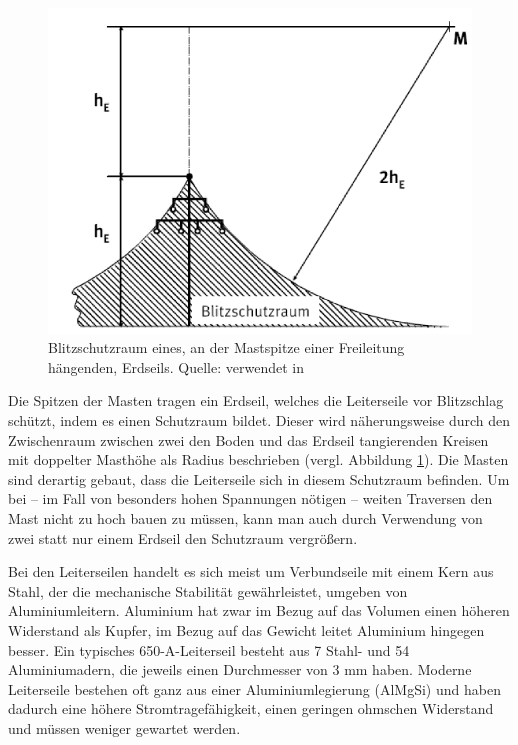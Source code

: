\begin{figure}[tbhn]
\begin{center}
\noindent
\includegraphics[scale=0.8]{blitzschutzraum.png}
\end{center}
\caption{Blitzschutzraum eines, an der Mastspitze einer Freileitung hängenden, Erdseils. Quelle: \cite{Harnischmacher} verwendet in \cite{BfN}}
\label{pic:blitzschutzraum}
\end{figure}

Die Spitzen der Masten tragen ein Erdseil, welches die Leiterseile vor Blitzschlag schützt, indem es einen Schutzraum bildet. Dieser wird näherungsweise durch den Zwischenraum zwischen zwei den Boden und das Erdseil tangierenden Kreisen mit doppelter Masthöhe als Radius beschrieben (vergl. Abbildung \ref{pic:blitzschutzraum}). Die Masten sind derartig gebaut, dass die Leiterseile sich in diesem Schutzraum befinden. Um bei – im Fall von besonders hohen Spannungen nötigen – weiten Traversen den Mast nicht zu hoch bauen zu müssen, kann man auch durch Verwendung von zwei statt nur einem Erdseil den Schutzraum vergrößern.

Bei den Leiterseilen handelt es sich meist um Verbundseile mit einem Kern aus Stahl, der die mechanische Stabilität gewährleistet, umgeben von Aluminiumleitern. Aluminium hat zwar im Bezug auf das Volumen einen höheren Widerstand als Kupfer, im Bezug auf das Gewicht leitet Aluminium hingegen besser. Ein typisches 650-A-Leiterseil besteht aus 7 Stahl- und 54 Aluminiumadern, die jeweils einen Durchmesser von 3 mm haben\cite{Harrison}.
Moderne Leiterseile bestehen oft ganz aus einer Aluminiumlegierung (AlMgSi) und haben dadurch eine höhere Stromtragefähigkeit, einen geringen ohmschen Widerstand und müssen weniger gewartet werden\cite{Harrison}\cite{Flosdorff}.

